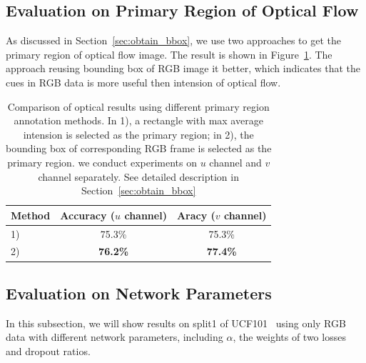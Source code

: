 \documentclass[10pt,twocolumn,letterpaper]{article}
\begin{document}
\subsection{Evaluation on Primary Region of Optical Flow}
As discussed in Section~\ref{sec:obtain_bbox}, we use two approaches to get the primary region of optical flow image. The result is shown in Figure~\ref{table:obtain_bbox}. The approach reusing bounding box of RGB image it better, which indicates that the cues in RGB data is more useful then intension of optical flow. 
\begin{table}
	\begin{center}
		\begin{tabular}{|l|c|c|}
			\hline
			Method 	& Accuracy ($u$ channel)	& Aracy ($v$ channel)\\
			\hline												
			1)		& 75.3\% 				& 75.3\% \\		
			2)		& \textbf{76.2\%} 	& \textbf{77.4\%} \\		
			\hline
		\end{tabular}
	\end{center}
	\caption{Comparison of optical results using different primary region annotation methods. In 1), a rectangle with max average intension is selected as the primary region; in 2), the bounding box of corresponding RGB frame is selected as the primary region. we conduct experiments on $u$ channel and $v$ channel separately. See detailed description in Section~\ref{sec:obtain_bbox}}
	\label{table:obtain_bbox}
\end{table}
\subsection{Evaluation on Network Parameters}
In this subsection, we will show results on split1 of UCF101~\cite{soomro2012ucf101} using only RGB data with different network parameters, including $\alpha$, the weights of two losses and dropout ratios.
\end{document}
